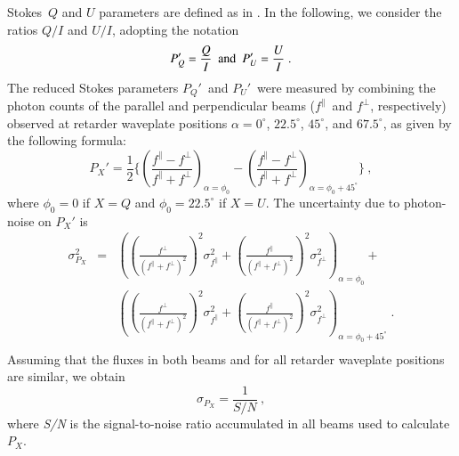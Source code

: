\documentclass[a4paper]{aa}
\newcommand{\pq}{\ensuremath{P_Q}}
\newcommand{\pu}{\ensuremath{P_U}}
\newcommand{\px}{\ensuremath{P_{X}}}
\newcommand{\fo}{\ensuremath{f^\parallel}}
\newcommand{\fe}{\ensuremath{f^\perp}}
\begin{document}
Stokes~$Q$ and $U$ parameters are defined as in \citet{Shurcliff62}.
In the following, we consider the ratios $Q/I$ and $U/I$,
adopting the notation
\begin{equation}
\pq' = \frac{Q}{I}\ \ {\rm and}\ \ \pu' = \frac{U}{I} \;.
\label{Eq_Pq_Pu_Def}
\end{equation}
The reduced Stokes parameters $\pq'$\ and $\pu'$\ were measured by combining
the photon counts of the parallel and perpendicular beams
(\fo\ and \fe, respectively) observed at retarder
waveplate positions $\alpha = 0^\circ$, $22.5^\circ$, $45^\circ$, and
$67.5^\circ$, as given by the following formula:
\begin{equation}
\px' = 
\frac{1}{2}
\Bigg\{ \left(\frac{\fo - \fe}{\fo + \fe}\right)_{\alpha= \phi_0} -
        \left(\frac{\fo - \fe}{\fo + \fe}\right)_{\alpha=\phi_0+45^\circ}
\Bigg\} \ ,
\label{Eq_Stokes}
\end{equation}
where $\phi_0 = 0$ if $X = Q$ and $\phi_0=22.5^\circ$
if $X = U$.
The uncertainty due to photon-noise on $\px'$ is 
\begin{equation}
\begin{array}{rcl}
\sigma^2_{P_X} & = &
  \left(\left(\frac{\fe}{(\fo + \fe)^2}\right)^2 \sigma^2_{\fo} +
  \left(\frac{\fo}{({\fo + \fe})^2}\right)^2
    \sigma^2_{\fe}\right)_{\alpha=\phi_0 } + \\
             &   &
  \left(\left(\frac{\fe}{({\fo + \fe})^2}\right)^2 \sigma^2_{\fo} +
  \left(\frac{\fo}{({\fo + \fe})^2}\right)^2
  \sigma^2_{\fe}\right)_{\alpha=\phi_0+45^\circ} \; . \\
\end{array}
\label{Eq_Sigma_QU}
\end{equation}
Assuming that the fluxes in both beams and
for all retarder waveplate positions are similar, we obtain
\begin{equation}
\sigma_{\px} = \frac{1}{S/N}\ ,
\end{equation}
where {\it S/N} is the signal-to-noise ratio accumulated
in all beams used to calculate \px.
\end{document}
